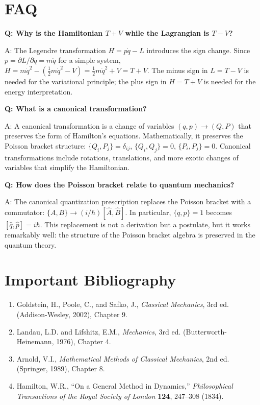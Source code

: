 \documentclass[11pt,openright]{book}
\begin{document}
\section*{FAQ}

\textbf{Q: Why is the Hamiltonian $T + V$ while the Lagrangian is $T - V$?}

A: The Legendre transformation $H = p\dot{q} - L$ introduces the sign change. Since $p = \partial L/\partial\dot{q} = m\dot{q}$ for a simple system, $H = m\dot{q}^2 - (\frac{1}{2}m\dot{q}^2 - V) = \frac{1}{2}m\dot{q}^2 + V = T + V$. The minus sign in $L = T - V$ is needed for the variational principle; the plus sign in $H = T + V$ is needed for the energy interpretation.

\textbf{Q: What is a canonical transformation?}

A: A canonical transformation is a change of variables $(q, p) \to (Q, P)$ that preserves the form of Hamilton's equations. Mathematically, it preserves the Poisson bracket structure: $\{Q_i, P_j\} = \delta_{ij}$, $\{Q_i, Q_j\} = 0$, $\{P_i, P_j\} = 0$. Canonical transformations include rotations, translations, and more exotic changes of variables that simplify the Hamiltonian.

\textbf{Q: How does the Poisson bracket relate to quantum mechanics?}

A: The canonical quantization prescription replaces the Poisson bracket with a commutator: $\{A, B\} \to (i/\hbar)[\hat{A}, \hat{B}]$. In particular, $\{q, p\} = 1$ becomes $[\hat{q}, \hat{p}] = i\hbar$. This replacement is not a derivation but a postulate, but it works remarkably well: the structure of the Poisson bracket algebra is preserved in the quantum theory.
\section*{Important Bibliography}

\begin{enumerate}
\item Goldstein, H., Poole, C., and Safko, J., \textit{Classical Mechanics}, 3rd ed. (Addison-Wesley, 2002), Chapter 9.
\item Landau, L.D. and Lifshitz, E.M., \textit{Mechanics}, 3rd ed. (Butterworth-Heinemann, 1976), Chapter 4.
\item Arnold, V.I., \textit{Mathematical Methods of Classical Mechanics}, 2nd ed. (Springer, 1989), Chapter 8.
\item Hamilton, W.R., ``On a General Method in Dynamics,'' \textit{Philosophical Transactions of the Royal Society of London} \textbf{124}, 247--308 (1834).
\end{enumerate}
\end{document}

